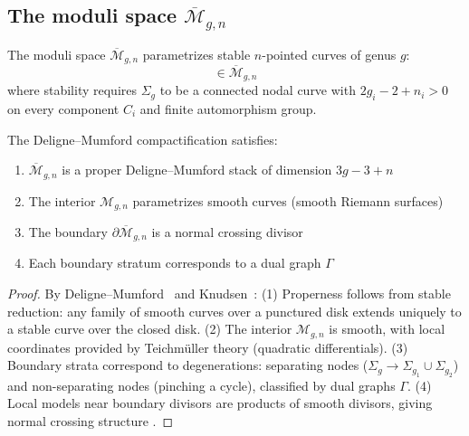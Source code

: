 \subsection{\texorpdfstring{The moduli space $\overline{\mathcal{M}}_{g,n}$}{The moduli space M-g,n}}

\begin{definition}
\label{def:deligne-mumford-compactification}
The moduli space $\overline{\mathcal{M}}_{g,n}$ parametrizes stable $n$-pointed curves of genus $g$:
\begin{equation}
[\Sigma_g; p_1, \ldots, p_n] \in \overline{\mathcal{M}}_{g,n}
\end{equation}
where stability requires $\Sigma_g$ to be a connected nodal curve with $2g_i - 2 + n_i > 0$ on every component $C_i$ and finite automorphism group.
\end{definition}

\begin{theorem}
\label{thm:moduli-structure}
The Deligne--Mumford compactification satisfies:
\begin{enumerate}
\item $\overline{\mathcal{M}}_{g,n}$ is a proper Deligne--Mumford stack of dimension $3g-3+n$
\item The interior $\mathcal{M}_{g,n}$ parametrizes smooth curves (smooth Riemann surfaces)
\item The boundary $\partial \overline{\mathcal{M}}_{g,n}$ is a normal crossing divisor
\item Each boundary stratum corresponds to a dual graph $\Gamma$
\end{enumerate}
\end{theorem}

\begin{proof}
By Deligne--Mumford~\cite{DeligneM69} and Knudsen~\cite{Knudsen83}:
(1) Properness follows from stable reduction: any family of smooth curves over a punctured disk extends uniquely to a stable curve over the closed disk.
(2) The interior $\mathcal{M}_{g,n}$ is smooth, with local coordinates provided by Teichm\"uller theory (quadratic differentials).
(3) Boundary strata correspond to degenerations: separating nodes ($\Sigma_g \to \Sigma_{g_1} \cup \Sigma_{g_2}$) and non-separating nodes (pinching a cycle), classified by dual graphs $\Gamma$.
(4) Local models near boundary divisors are products of smooth divisors, giving normal crossing structure \cite{Knudsen83}.
\end{proof}

